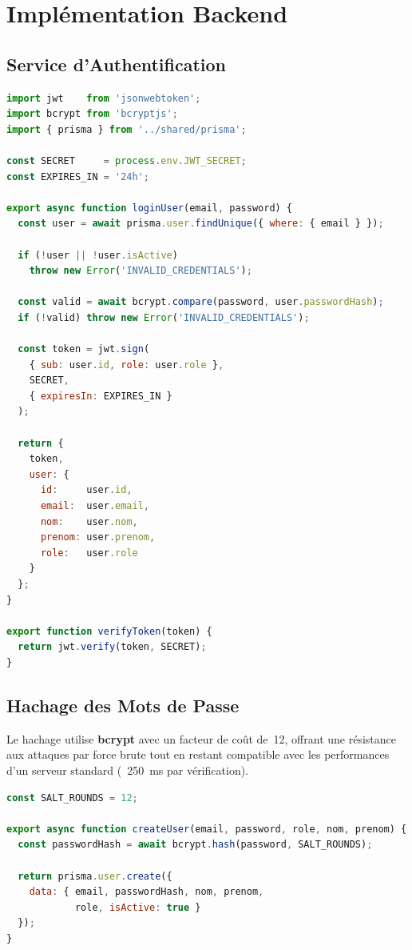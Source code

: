 \documentclass[12pt,a4paper,oneside]{report}
\newcommand{\tech}[1]{\textbf{\color{SoftEspresso}#1}}
\begin{document}
\section{Implémentation Backend}

\subsection{Service d'Authentification}

\begin{lstlisting}[language=JavaScript,
  caption=auth.service.ts --- Connexion et generation du token JWT]
import jwt    from 'jsonwebtoken';
import bcrypt from 'bcryptjs';
import { prisma } from '../shared/prisma';

const SECRET     = process.env.JWT_SECRET;
const EXPIRES_IN = '24h';

export async function loginUser(email, password) {
  const user = await prisma.user.findUnique({ where: { email } });

  if (!user || !user.isActive)
    throw new Error('INVALID_CREDENTIALS');

  const valid = await bcrypt.compare(password, user.passwordHash);
  if (!valid) throw new Error('INVALID_CREDENTIALS');

  const token = jwt.sign(
    { sub: user.id, role: user.role },
    SECRET,
    { expiresIn: EXPIRES_IN }
  );

  return {
    token,
    user: {
      id:     user.id,
      email:  user.email,
      nom:    user.nom,
      prenom: user.prenom,
      role:   user.role
    }
  };
}

export function verifyToken(token) {
  return jwt.verify(token, SECRET);
}
\end{lstlisting}

\subsection{Hachage des Mots de Passe}

Le hachage utilise \tech{bcrypt} avec un facteur de coût de~12, offrant
une résistance aux attaques par force brute tout en restant compatible
avec les performances d'un serveur standard (~250~ms par vérification).

\begin{lstlisting}[language=JavaScript,
  caption=auth.service.ts --- Creation d'un compte avec hachage bcrypt]
const SALT_ROUNDS = 12;

export async function createUser(email, password, role, nom, prenom) {
  const passwordHash = await bcrypt.hash(password, SALT_ROUNDS);

  return prisma.user.create({
    data: { email, passwordHash, nom, prenom,
            role, isActive: true }
  });
}
\end{lstlisting}
\end{document}
